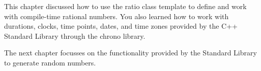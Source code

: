 This chapter discussed how to use the ratio class template to define and work with compile-time rational numbers. You also learned how to work with durations, clocks, time points, dates, and time zones provided by the C++ Standard Library through the chrono library.

The next chapter focusses on the functionality provided by the Standard Library to generate random numbers.